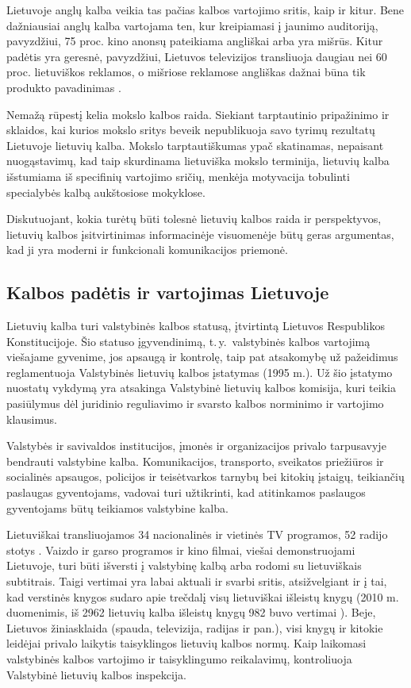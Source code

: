 \begin{multicols}{2}
    Lietuvoje anglų kalba veikia tas pačias kalbos vartojimo sritis, kaip ir kitur. Bene dažniausiai anglų kalba vartojama ten, kur kreipiamasi į jaunimo auditoriją, pavyzdžiui, 75 proc. kino anonsų pateikiama angliškai arba yra mišrūs. Kitur padėtis yra geresnė, pavyzdžiui, Lietuvos televizijos transliuoja daugiau nei 60 proc. lietuviškos reklamos, o mišriose reklamose angliškas dažnai būna tik produkto pavadinimas \cite{nbi2}.

Nemažą rūpestį kelia mokslo kalbos raida. Siekiant tarptautinio pripažinimo ir sklaidos, kai kurios mokslo sritys beveik nepublikuoja savo tyrimų rezultatų Lietuvoje lietuvių kalba. Mokslo tarptautiškumas ypač skatinamas, nepaisant nuogąstavimų, kad taip skurdinama lietuviška mokslo terminija, lietuvių kalba išstumiama iš specifinių vartojimo sričių, menkėja motyvacija tobulinti specialybės kalbą aukštosiose mokyklose.

Diskutuojant, kokia turėtų būti tolesnė lietuvių kalbos raida ir perspektyvos, lietuvių kalbos įsitvirtinimas informacinėje visuomenėje būtų geras argumentas, kad ji yra moderni ir funkcionali komunikacijos priemonė.

\subsection{Kalbos padėtis ir vartojimas Lietuvoje}

Lietuvių kalba turi valstybinės kalbos statusą, įtvirtintą Lietuvos Respublikos Konstitucijoje. Šio statuso įgyvendinimą, t.\,y.~valstybinės kalbos vartojimą viešajame gyvenime, jos apsaugą ir kontrolę, taip pat atsakomybę už pažeidimus reglamentuoja Valstybinės lietuvių kalbos įstatymas (1995 m.). Už šio įstatymo nuostatų vykdymą yra atsakinga Valstybinė lietuvių kalbos komisija, kuri teikia pasiūlymus dėl juridinio reguliavimo ir svarsto kalbos norminimo ir vartojimo klausimus.  


 Valstybės ir savivaldos institucijos, įmonės ir organizacijos privalo tarpusavyje bendrauti valstybine kalba. Komunikacijos, transporto, sveikatos priežiūros ir socialinės apsaugos, policijos ir teisėtvarkos tarnybų bei kitokių įstaigų, teikiančių paslaugas gyventojams, vadovai turi užtikrinti, kad atitinkamos paslaugos gyventojams būtų teikiamos valstybine kalba.   

    Lietuviškai transliuojamos 34 nacionalinės ir vietinės TV programos, 52 radijo stotys \cite{ldrt}.  Vaizdo ir garso programos ir kino filmai, viešai demonstruojami Lietuvoje, turi būti išversti į valstybinę kalbą arba rodomi su lietuviškais subtitrais. Taigi vertimai yra labai aktuali ir svarbi sritis, atsižvelgiant ir į tai, kad verstinės knygos sudaro apie trečdalį visų lietuviškai išleistų knygų (2010 m. duomenimis, iš 2962 lietuvių kalba išleistų knygų 982 buvo vertimai \cite{bbsc}).  Beje, Lietuvos žiniasklaida (spauda, televizija, radijas ir pan.), visi knygų ir kitokie leidėjai privalo laikytis taisyklingos lietuvių kalbos normų. Kaip laikomasi valstybinės kalbos vartojimo ir taisyklingumo reikalavimų, kontroliuoja Valstybinė lietuvių kalbos inspekcija.   


\end{multicols}
